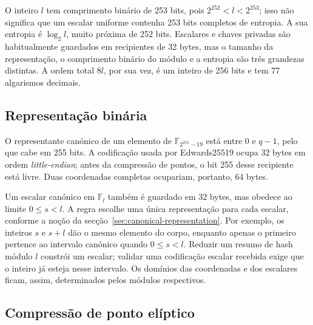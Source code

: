 O inteiro \(l\) tem comprimento binário de 253 bits, pois
\(2^{252}<l<2^{253}\); isso não significa que um escalar uniforme contenha
253 bits completos de entropia. A sua entropia é \(\log_2 l\), muito próxima
de 252 bits. Escalares e chaves privadas são habitualmente guardados em
recipientes de 32 bytes, mas o tamanho da representação, o comprimento binário
do módulo e a entropia são três grandezas distintas. A ordem total \(8l\), por
sua vez, é um inteiro de 256 bits e tem 77 algarismos decimais.


\subsection{Representação binária}
\label{binary_note}
O representante canónico de um elemento de
\(\mathbb{F}_{2^{255}-19}\) está entre \(0\) e \(q-1\), pelo que cabe em 255
bits. A codificação usada por Edwards25519 ocupa 32 bytes em ordem
{\em little-endian}; antes da compressão de pontos, o bit 255 desse recipiente
está livre. Duas coordenadas completas ocupariam, portanto, 64 bytes.

Um escalar canónico em \(\mathbb{F}_l\) também é guardado em 32 bytes, mas
obedece ao limite \(0\leq s<l\). A regra escolhe uma única representação
para cada escalar, conforme a noção da secção~\ref{sec:canonical-representation}.
Por exemplo, os inteiros \(s\) e \(s+l\) dão o mesmo elemento do corpo,
enquanto apenas o primeiro pertence ao intervalo canónico quando
\(0\leq s<l\). Reduzir um resumo de hash módulo \(l\) constrói um escalar;
validar uma codificação escalar recebida exige que o inteiro já esteja
nesse intervalo. Os domínios das coordenadas e dos escalares ficam, assim,
determinados pelos módulos respectivos.


\subsection{Compressão de ponto elíptico}
\label{point_compression_section}

